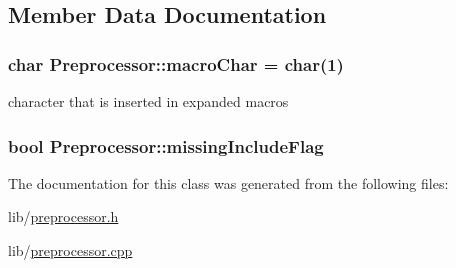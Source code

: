 \subsection{Member Data Documentation}
\hypertarget{class_preprocessor_ae3ff55f4bd43ba3ef47d4d673f5c50fe}{
\subsubsection[{macro\-Char}]{\setlength{\rightskip}{0pt plus 5cm}char Preprocessor\-::macro\-Char = char(1)\hspace{0.3cm}{\ttfamily [static]}}}\label{class_preprocessor_ae3ff55f4bd43ba3ef47d4d673f5c50fe}
character that is inserted in expanded macros \hypertarget{class_preprocessor_a3460bda4d7e3346862b19a45619a3fb4}{
\subsubsection[{missing\-Include\-Flag}]{\setlength{\rightskip}{0pt plus 5cm}bool Preprocessor\-::missing\-Include\-Flag\hspace{0.3cm}{\ttfamily [static]}}}\label{class_preprocessor_a3460bda4d7e3346862b19a45619a3fb4}


The documentation for this class was generated from the following files\-:\begin{DoxyCompactItemize}
\item 
lib/\hyperlink{preprocessor_8h}{preprocessor.\-h}\item 
lib/\hyperlink{preprocessor_8cpp}{preprocessor.\-cpp}\end{DoxyCompactItemize}
